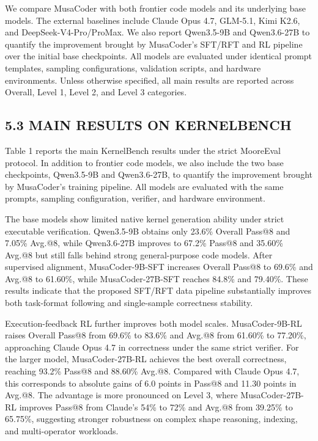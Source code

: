 \documentclass[
  10
]{article}
\begin{document}
We compare MusaCoder with both frontier code models and its underlying
base models. The external baselines include Claude Opus 4.7, GLM-5.1,
Kimi K2.6, and DeepSeek-V4-Pro/ProMax. We also report Qwen3.5-9B and
Qwen3.6-27B to quantify the improvement brought by MusaCoder's SFT/RFT
and RL pipeline over the initial base checkpoints. All models are
evaluated under identical prompt templates, sampling configurations,
validation scripts, and hardware environments. Unless otherwise
specified, all main results are reported across Overall, Level 1, Level
2, and Level 3 categories.

\subsection{5.3 MAIN RESULTS ON
KERNELBENCH}\label{main-results-on-kernelbench}

Table 1 reports the main KernelBench results under the strict MooreEval
protocol. In addition to frontier code models, we also include the two
base checkpoints, Qwen3.5-9B and Qwen3.6-27B, to quantify the
improvement brought by MusaCoder's training pipeline. All models are
evaluated with the same prompts, sampling configuration, verifier, and
hardware environment.

The base models show limited native kernel generation ability under
strict executable verification. Qwen3.5-9B obtains only 23.6\% Overall
Pass@8 and 7.05\% Avg.@8, while Qwen3.6-27B improves to 67.2\% Pass@8
and 35.60\% Avg.@8 but still falls behind strong general-purpose code
models. After supervised alignment, MusaCoder-9B-SFT increases Overall
Pass@8 to 69.6\% and Avg.@8 to 61.60\%, while MusaCoder-27B-SFT reaches
84.8\% and 79.40\%. These results indicate that the proposed SFT/RFT
data pipeline substantially improves both task-format following and
single-sample correctness stability.

Execution-feedback RL further improves both model scales.
MusaCoder-9B-RL raises Overall Pass@8 from 69.6\% to 83.6\% and Avg.@8
from 61.60\% to 77.20\%, approaching Claude Opus 4.7 in correctness
under the same strict verifier. For the larger model, MusaCoder-27B-RL
achieves the best overall correctness, reaching 93.2\% Pass@8 and
88.60\% Avg.@8. Compared with Claude Opus 4.7, this corresponds to
absolute gains of 6.0 points in Pass@8 and 11.30 points in Avg.@8. The
advantage is more pronounced on Level 3, where MusaCoder-27B-RL improves
Pass@8 from Claude's 54\% to 72\% and Avg.@8 from 39.25\% to 65.75\%,
suggesting stronger robustness on complex shape reasoning, indexing, and
multi-operator workloads.
\end{document}
